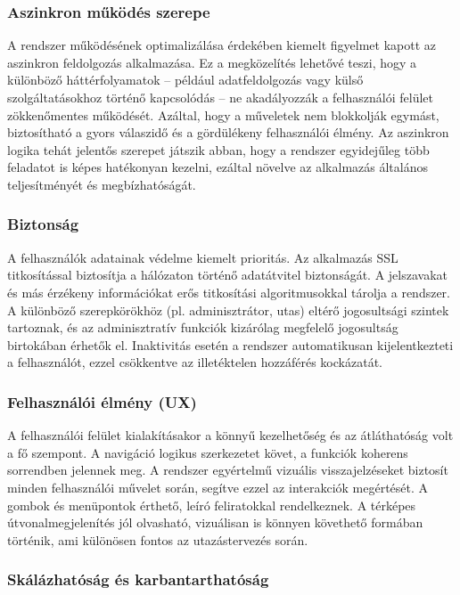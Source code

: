 \subsubsection{Aszinkron működés szerepe}

\indent A rendszer működésének optimalizálása érdekében kiemelt figyelmet kapott az aszinkron feldolgozás alkalmazása. Ez a megközelítés lehetővé teszi, hogy a különböző háttérfolyamatok – például adatfeldolgozás vagy külső szolgáltatásokhoz történő kapcsolódás – ne akadályozzák a felhasználói felület zökkenőmentes működését. Azáltal, hogy a műveletek nem blokkolják egymást, biztosítható a gyors válaszidő és a gördülékeny felhasználói élmény. Az aszinkron logika tehát jelentős szerepet játszik abban, hogy a rendszer egyidejűleg több feladatot is képes hatékonyan kezelni, ezáltal növelve az alkalmazás általános teljesítményét és megbízhatóságát.


\subsubsection{Biztonság}

A felhasználók adatainak védelme kiemelt prioritás. Az alkalmazás SSL titkosítással biztosítja a hálózaton történő adatátvitel biztonságát. A jelszavakat és más érzékeny információkat erős titkosítási algoritmusokkal tárolja a rendszer. A különböző szerepkörökhöz (pl. adminisztrátor, utas) eltérő jogosultsági szintek tartoznak, és az adminisztratív funkciók kizárólag megfelelő jogosultság birtokában érhetők el. Inaktivitás esetén a rendszer automatikusan kijelentkezteti a felhasználót, ezzel csökkentve az illetéktelen hozzáférés kockázatát.

\subsubsection{Felhasználói élmény (UX)}

A felhasználói felület kialakításakor a könnyű kezelhetőség és az átláthatóság volt a fő szempont. A navigáció logikus szerkezetet követ, a funkciók koherens sorrendben jelennek meg. A rendszer egyértelmű vizuális visszajelzéseket biztosít minden felhasználói művelet során, segítve ezzel az interakciók megértését. A gombok és menüpontok érthető, leíró feliratokkal rendelkeznek. A térképes útvonalmegjelenítés jól olvasható, vizuálisan is könnyen követhető formában történik, ami különösen fontos az utazástervezés során.

\subsubsection{Skálázhatóság és karbantarthatóság}

